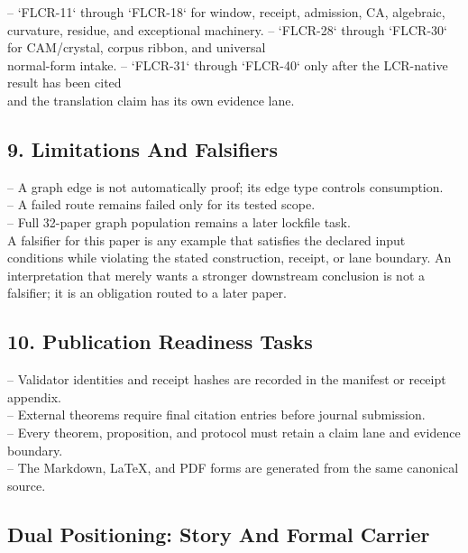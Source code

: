 \documentclass[11pt]{article}
\begin{document}
\noindent{}-- `FLCR-11` through `FLCR-18` for window, receipt, admission, CA, algebraic,\\
  curvature, residue, and exceptional machinery.
\noindent{}-- `FLCR-28` through `FLCR-30` for CAM/crystal, corpus ribbon, and universal\\
  normal-form intake.
\noindent{}-- `FLCR-31` through `FLCR-40` only after the LCR-native result has been cited\\
  and the translation claim has its own evidence lane.

\subsection*{9. Limitations And Falsifiers}

\noindent{}-- A graph edge is not automatically proof; its edge type controls consumption.\\
\noindent{}-- A failed route remains failed only for its tested scope.\\
\noindent{}-- Full 32-paper graph population remains a later lockfile task.\\

A falsifier for this paper is any example that satisfies the declared input
conditions while violating the stated construction, receipt, or lane boundary.
An interpretation that merely wants a stronger downstream conclusion is not a
falsifier; it is an obligation routed to a later paper.

\subsection*{10. Publication Readiness Tasks}

\noindent{}-- Validator identities and receipt hashes are recorded in the manifest or receipt appendix.\\
\noindent{}-- External theorems require final citation entries before journal submission.\\
\noindent{}-- Every theorem, proposition, and protocol must retain a claim lane and evidence boundary.\\
\noindent{}-- The Markdown, LaTeX, and PDF forms are generated from the same canonical source.\\

\subsection*{Dual Positioning: Story And Formal Carrier}
\end{document}

